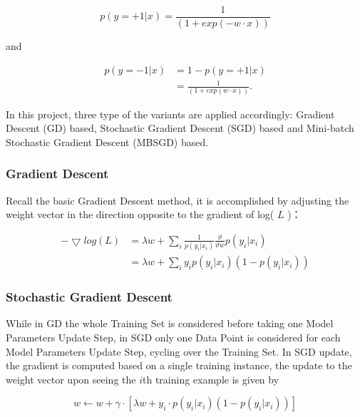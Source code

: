 \documentclass[sigconf]{acmart}
\begin{document}
\begin{equation}
p(y=+1|x)= \frac{1}{(1+exp(-w \cdot x))}
\end{equation}

and

\begin{equation}
\begin{split}
p(y=-1|x) &= 1-p(y=+1|x) \\
  &=\frac{1}{(1+exp(w \cdot x))}.
\end{split}
\end{equation}

In this project, three type of the variants are applied accordingly: Gradient Descent (GD) based, Stochastic Gradient Descent (SGD) based and Mini-batch Stochastic Gradient Descent (MBSGD) based.

\subsubsection{Gradient Descent}
\label{subsection:logisticGD}

Recall the basic Gradient Descent method, it is accomplished by adjusting the weight vector in the direction opposite to the gradient of log( $L$ )：

\begin{equation}
\begin{split}
-\bigtriangledown log(L) &= \lambda w + \sum_i \frac{1}{p(y_i |x_i )} \frac{ \vartheta}{\vartheta w} p(y_i |x_i )  \\
  &=\lambda w + \sum_i y_i p(y_i |x_i )(1-p(y_i |x_i ))
\end{split}
\end{equation}

\subsubsection{Stochastic Gradient Descent}
\label{subsection:logisticSGD}

While in GD the whole Training Set is considered before taking one Model Parameters Update Step, in SGD only one Data Point is considered for each Model Parameters Update Step, cycling over the Training Set. \cite{bottou2010large} In SGD update, the gradient is computed based on a single training instance, the update to the weight vector upon seeing the $i$th training example is given by 

\begin{equation}
w \leftarrow w + \gamma \cdot [\lambda w + y_i \cdot p( y_i | x_i )(1-p( y_i | x_i ))]
\end{equation}
\end{document}
